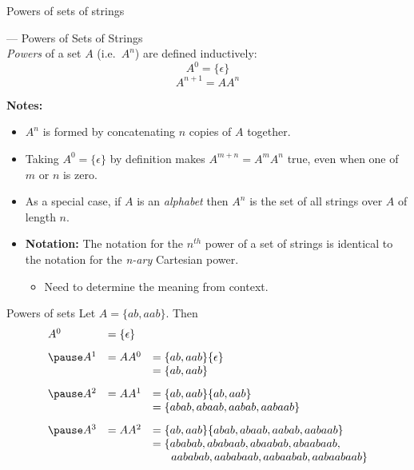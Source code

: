 \begin{slide}[bm=,toc=]{Powers of sets of strings}
\begin{defn}{--- Powers of Sets of Strings}~\\
\pause
\emph{Powers} of a set $A$ (i.e.\ $A^n$) are defined inductively:
\pause
\[
  A^0 = \{\epsilon\}
\]
\pause
\[
  A^{n+1} = AA^n
\]
\end{defn}
\vspace{-5mm}
\pause
\textbf{Notes:}
\begin{itemize}
\item<5-> $A^n$ is formed by concatenating $n$ copies of $A$ together. 
\item<6-> Taking $A^0 = \{\epsilon\}$ by definition makes $A^{m+n} = A^mA^n$ true, 
      even when one of $m$ or $n$ is zero. 
\item<7-> As a special case, if $A$ is an \emph{alphabet} then $A^n$ is the set of all strings
over $A$ of length $n$.
\item<8-> \textbf{Notation:} The notation for the $n^{th}$ power of a set of strings is identical to
    the notation for the \emph{n-ary} Cartesian power.
\begin{itemize}
\item<9-> Need to determine the meaning from context.
\end{itemize}
\end{itemize}
\end{slide}

\begin{slide}[bm=,toc=]{Powers of sets}
Let $A = \{ab,aab\}$. Then
\pause
\[
\begin{array}{lll}
A^0 &= \{\epsilon\} & \\[2ex]
\pause

A^1 &= AA^0         &= \{ab,aab\}\{\epsilon\} \\
    &               &= \{ab,aab\} \\[2ex]

\pause
A^2 &= AA^1         &= \{ab,aab\}\{ab,aab\}   \\
    &               &= \{abab,abaab,aabab,aabaab\} \\[2ex]

\pause
A^3 &= AA^2         &= \{ab,aab\}\{abab,abaab,aabab,aabaab\}  \\
    &               &= \{ababab,ababaab,abaabab,abaabaab,  \\
    &               &\;\;\;\;\;\;aababab,aababaab,aabaabab,aabaabaab \}  \\
\end{array}
\]
\end{slide}

